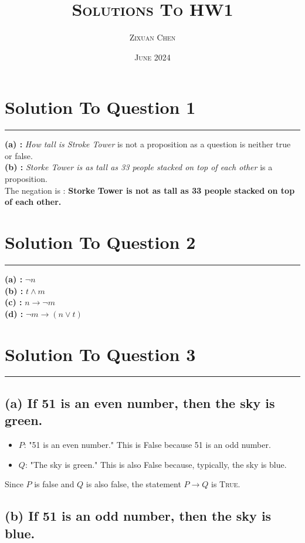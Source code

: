 \documentclass{article}
\title{\scshape{Solutions To HW1}}
\author{\scshape{Zixuan Chen}}
\date{\scshape{June 2024}}
\begin{document}
\maketitle

\section*{Solution To Question 1}
\hrule 
\textbf{(a) : } \textit{How tall is Stroke Tower} is not a proposition as a question is neither true or false. \\[4pt]
\textbf{(b) : } \textit{Storke Tower is as tall as 33 people stacked on top of each other} is a proposition. \\[4pt]
The negation is : \textbf{Storke Tower is not as tall as 33 people stacked on top of each other.} 

\section*{Solution To Question 2}
\hrule
\textbf{(a) : } $\lnot n$ \\[4pt]
\textbf{(b) : } $t \land m$\\[4pt]
\textbf{(c) : } $n \to \lnot m$\\[4pt]
\textbf{(d) : } $\lnot m \to (n \lor t )$

\section*{Solution To Question 3}
\hrule
\subsection*{(a) If 51 is an even number, then the sky is green.}
\begin{itemize}
    \item \(P\): "51 is an even number." This is False because 51 is an odd number.
    \item \(Q\): "The sky is green." This is also False because, typically, the sky is blue.
\end{itemize}

Since \(P\) is false and \(Q\) is also false, the statement \(P \rightarrow Q\) is \textsc{True}.\\

\subsection*{(b) If 51 is an odd number, then the sky is blue.}
\end{document}
